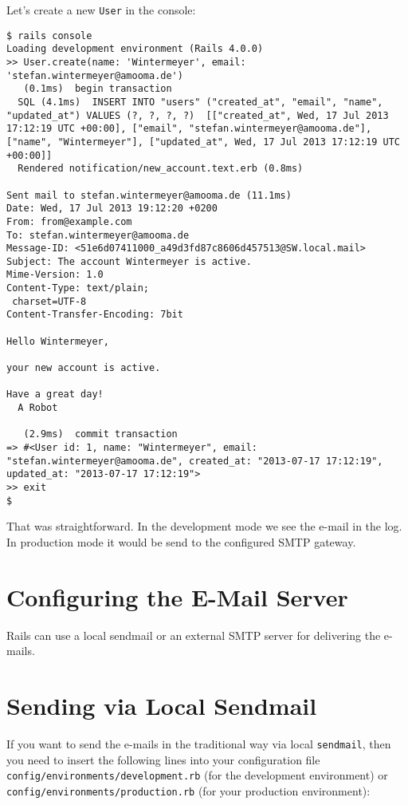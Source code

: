 \documentclass[a4paper]{book}
\begin{document}
Let's create a new \texttt{User} in the console:

\begin{shaded}\begin{verbatim}
$ rails console
Loading development environment (Rails 4.0.0)
>> User.create(name: 'Wintermeyer', email: 'stefan.wintermeyer@amooma.de')
   (0.1ms)  begin transaction
  SQL (4.1ms)  INSERT INTO "users" ("created_at", "email", "name", "updated_at") VALUES (?, ?, ?, ?)  [["created_at", Wed, 17 Jul 2013 17:12:19 UTC +00:00], ["email", "stefan.wintermeyer@amooma.de"], ["name", "Wintermeyer"], ["updated_at", Wed, 17 Jul 2013 17:12:19 UTC +00:00]]
  Rendered notification/new_account.text.erb (0.8ms)

Sent mail to stefan.wintermeyer@amooma.de (11.1ms)
Date: Wed, 17 Jul 2013 19:12:20 +0200
From: from@example.com
To: stefan.wintermeyer@amooma.de
Message-ID: <51e6d07411000_a49d3fd87c8606d457513@SW.local.mail>
Subject: The account Wintermeyer is active.
Mime-Version: 1.0
Content-Type: text/plain;
 charset=UTF-8
Content-Transfer-Encoding: 7bit

Hello Wintermeyer,

your new account is active.

Have a great day!
  A Robot

   (2.9ms)  commit transaction
=> #<User id: 1, name: "Wintermeyer", email: "stefan.wintermeyer@amooma.de", created_at: "2013-07-17 17:12:19", updated_at: "2013-07-17 17:12:19">
>> exit
$
\end{verbatim}\end{shaded}

That was straightforward. In the development mode we see the e-mail in the log. In production mode it would be send to the configured SMTP gateway.

\section{Configuring the E-Mail Server}\label{configuring-the-e-mail-server}

Rails can use a local sendmail or an external SMTP server for delivering the e-mails.

\section{Sending via Local Sendmail}\label{sending-via-local-sendmail}

If you want to send the e-mails in the traditional way via local \texttt{sendmail}, then you need to insert the following lines into your configuration file \texttt{config/environments/development.rb} (for the development environment) or \texttt{config/environments/production.rb} (for your production environment):
\end{document}
